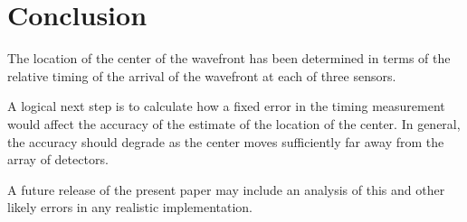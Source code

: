 \documentclass[twocolumn]{article}
\begin{document}
\section{Conclusion}

The location of the center of the wavefront has been determined in terms of the
relative timing of the arrival of the wavefront at each of three sensors.

A logical next step is to calculate how a fixed error in the timing measurement
would affect the accuracy of the estimate of the location of the center.  In
general, the accuracy should degrade as the center moves sufficiently far away
from the array of detectors.

A future release of the present paper may include an analysis of this and other
likely errors in any realistic implementation.

%
%
%
%

\newpage


\end{document}
